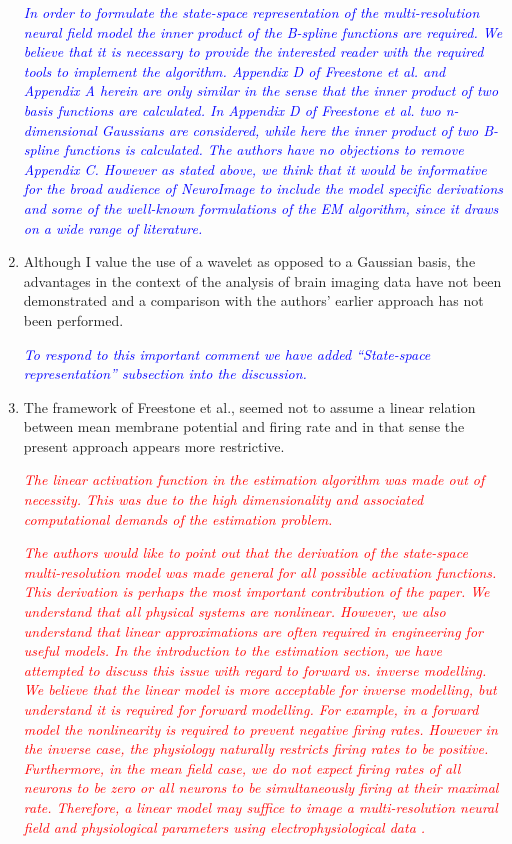 \documentclass{article}
\newcommand{\dean}[1]{\textcolor{red}{#1}}
\newcommand{\parham}[1]{\textcolor{blue}{#1}}
\begin{document}
\begin{enumerate}
\emph{\parham{In order to formulate the state-space representation of the multi-resolution neural field model the inner product of the B-spline functions are required. We believe that it is necessary to provide the interested reader with the required tools to implement the algorithm. Appendix D of Freestone et al. and Appendix A herein are only similar in the sense that the inner product of two basis functions are calculated. In Appendix D of Freestone et al. two  n-dimensional Gaussians are considered, while here the inner product of two B-spline functions is calculated. The authors have no objections to remove Appendix C. However as stated above, we think that it would be informative for the broad audience of NeuroImage to include the model specific derivations and some of the well-known formulations of the EM algorithm, since it draws on a wide range of literature.} }

        \item Although I value the use of a wavelet as opposed to a Gaussian basis, the advantages in the context of the analysis of brain imaging data have not been demonstrated and a comparison with the authors' earlier approach has not been performed.  

\emph{\parham{To respond to this important comment we have added ``State-space representation'' subsection into the discussion.}}

				\item{The framework of Freestone et al., seemed not to assume a linear relation between mean membrane potential and firing rate and in that sense the present approach appears more restrictive. }

\emph{\dean{The linear activation function in the estimation algorithm was made out of necessity. This was due to the high dimensionality and associated computational demands of the estimation problem.}}

\emph{\dean{The authors would like to point out that the derivation of the state-space multi-resolution model was made general for all possible activation functions. This derivation is perhaps the most important contribution of the paper. We understand that all physical systems are nonlinear. However, we also understand that linear approximations are often required in engineering for useful models. In the introduction to the estimation section, we have attempted to discuss this issue with regard to forward vs. inverse modelling. We believe that the linear model is more acceptable for inverse modelling, but understand it is required for forward modelling. For example, in a forward model the nonlinearity is required to prevent negative firing rates. However in the inverse case, the physiology naturally restricts firing rates to be positive. Furthermore, in the mean field case, we do not expect firing rates of all neurons to be zero or all neurons to be simultaneously firing at their maximal rate. Therefore, a linear model may suffice to image a multi-resolution neural field and physiological parameters using electrophysiological data .}}
				

\end{enumerate}
\end{document}
